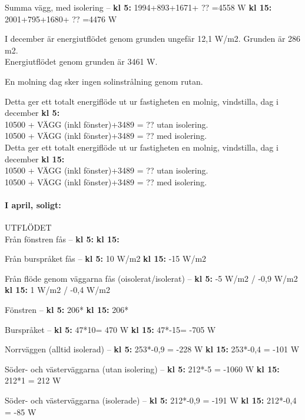 Summa vägg, med isolering –
\textbf{kl 5:} 1994+893+1671+ ?? =4558 W
\textbf{kl 15:} 2001+795+1680+ ?? =4476 W

I december är energiutflödet genom grunden ungefär 12,1 W/m2. Grunden är 286 m2.\\
Energiutflödet genom grunden är 3461 W.

En molning dag sker ingen solinstrålning genom rutan.

Detta ger ett totalt energiflöde ut ur fastigheten en molnig, vindstilla, dag i december \textbf{kl 5:}\\
10500 + VÄGG (inkl fönster)+3489 = ?? utan isolering.\\
10500 + VÄGG (inkl fönster)+3489 = ?? med isolering.\\

Detta ger ett totalt energiflöde ut ur fastigheten en molnig, vindstilla, dag i december \textbf{kl 15:}\\
10500 + VÄGG (inkl fönster)+3489 = ?? utan isolering.\\
10500 + VÄGG (inkl fönster)+3489 = ?? med isolering.\\


\paragraph{I april, soligt:}
UTFLÖDET\\

Från fönstren fås –
\textbf{kl 5:} 
\textbf{kl 15:} 

Från burspråket fås –
\textbf{kl 5:} 10 W/m2
\textbf{kl 15:} -15 W/m2

Från flöde genom väggarna fås (oisolerat/isolerat) –
\textbf{kl 5:} -5 W/m2 / -0,9 W/m2
\textbf{kl 15:} 1 W/m2 / -0,4 W/m2


Fönstren –
\textbf{kl 5:} 206*
\textbf{kl 15:} 206*

Burspråket – 
\textbf{kl 5:} 47*10= 470 W
\textbf{kl 15:} 47*-15= -705 W

Norrväggen (alltid isolerad) –
\textbf{kl 5:} 253*-0,9 = -228 W
\textbf{kl 15:} 253*-0,4 = -101 W

Söder- och västerväggarna (utan isolering) –
\textbf{kl 5:} 212*-5 = -1060 W
\textbf{kl 15:} 212*1 = 212 W

Söder- och västerväggarna (isolerade) –
\textbf{kl 5:} 212*-0,9 = -191 W
\textbf{kl 15:} 212*-0,4 = -85 W

